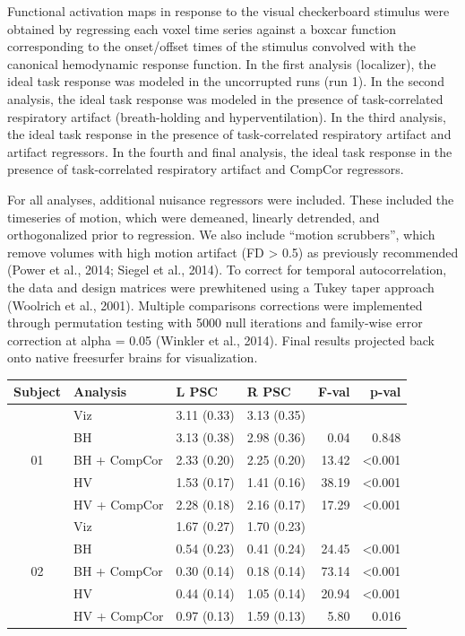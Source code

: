 \documentclass[9pt]{NEU502b-fmri}
\begin{document}
Functional activation maps in response to the visual checkerboard stimulus were obtained by regressing each voxel time series against a boxcar function corresponding to the onset/offset times of the stimulus convolved with the canonical hemodynamic response function. In the first analysis (localizer), the ideal task response was modeled in the uncorrupted runs (run 1). In the second analysis, the ideal task response was modeled in the presence of task-correlated respiratory artifact (breath-holding and hyperventilation). In the third analysis,  the ideal task response in the presence of task-correlated respiratory artifact and artifact regressors. In the fourth and final analysis, the ideal task response in the presence of task-correlated respiratory artifact and CompCor regressors.

For all analyses, additional nuisance regressors were included. These included the timeseries of motion, which were demeaned, linearly detrended, and orthogonalized prior to regression. We also include “motion scrubbers”, which remove volumes with high motion artifact (FD > 0.5) as previously recommended (Power et al., 2014; Siegel et al., 2014). To correct for temporal autocorrelation, the data and design matrices were prewhitened using a Tukey taper approach (Woolrich et al., 2001). Multiple comparisons corrections were implemented through permutation testing with 5000 null iterations and family-wise error correction at alpha = 0.05 (Winkler et al., 2014). Final results projected back onto native freesurfer brains for visualization. 

\nocite{*} %


\begin{tabular}{c l l l r r}
\toprule
{Subject} & Analysis & L PSC & R PSC & F-val & p-val \\
\midrule
\multirow{5}{*}{01} & Viz          & 3.11 (0.33) & 3.13 (0.35) &       & \\\cline{2-6}
                    & BH           & 3.13 (0.38) & 2.98 (0.36) & 0.04  & 0.848\\
                    & BH + CompCor & 2.33 (0.20) & 2.25 (0.20) & 13.42 & <0.001\\
                    & HV           & 1.53 (0.17) & 1.41 (0.16) & 38.19 & <0.001\\
                    & HV + CompCor & 2.28 (0.18) & 2.16 (0.17) & 17.29 & <0.001\\
\multirow{5}{*}{02} & Viz          & 1.67 (0.27) & 1.70 (0.23) &       & \\\cline{2-6}
                    & BH           & 0.54 (0.23) & 0.41 (0.24) & 24.45 & <0.001\\
                    & BH + CompCor & 0.30 (0.14) & 0.18 (0.14) & 73.14 & <0.001\\
                    & HV           & 0.44 (0.14) & 1.05 (0.14) & 20.94 & <0.001\\
                    & HV + CompCor & 0.97 (0.13) & 1.59 (0.13) & 5.80 & 0.016 \\
\bottomrule
\end{tabular}
\end{document}
